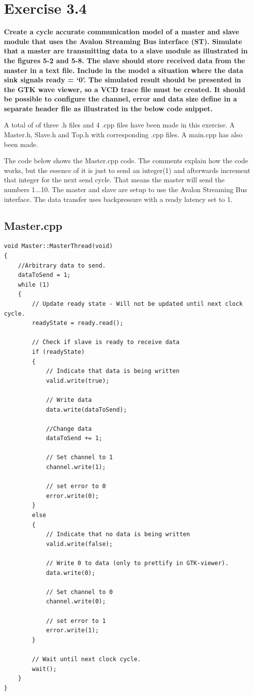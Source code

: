 
\chapter{Exercise 3.4}
\textbf{Create a cycle accurate communication model of a master and slave module that uses the
Avalon Streaming Bus interface (ST). Simulate that a master are transmitting data to a slave
module as illustrated in the figures 5-2 and 5-8. The slave should store received data from the master
in a text file. Include in the model a situation where the data sink signals ready = ‘0’. The simulated result
should be presented in the GTK wave viewer, so a VCD trace file must be created. It should be
possible to configure the channel, error and data size define in a separate header file as illustrated
in the below code snippet.}


A total of of three .h files and 4 .cpp files have been made in this exercise. A Master.h, Slave.h and Top.h with corresponding .cpp files. A main.cpp has also been made. 

The code below shows the Master.cpp code. The comments explain how the code works, but the essence of it is just to send an integer(1) and afterwards increment that integer for the next send cycle. That means the master will send the numbers 1...10. The master and slave are setup to use the Avalon Streaming Bus interface. The data transfer uses backpressure with a ready latency set to 1.  


\section{Master.cpp}
\begin{lstlisting}
void Master::MasterThread(void)
{
	//Arbitrary data to send.
	dataToSend = 1;
	while (1)
	{
		// Update ready state - Will not be updated until next clock cycle.
		readyState = ready.read();
		
		// Check if slave is ready to receive data
		if (readyState)
		{
			// Indicate that data is being written
			valid.write(true);
			
			// Write data
			data.write(dataToSend);
			
			//Change data
			dataToSend += 1;
			
			// Set channel to 1
			channel.write(1);
			
			// set error to 0
			error.write(0);
		}
		else
		{
			// Indicate that no data is being written
			valid.write(false);
			
			// Write 0 to data (only to prettify in GTK-viewer).
			data.write(0);
			
			// Set channel to 0
			channel.write(0);
			
			// set error to 1
			error.write(1);
		}
		
		// Wait until next clock cycle.
		wait();
	}
}
\end{lstlisting}

